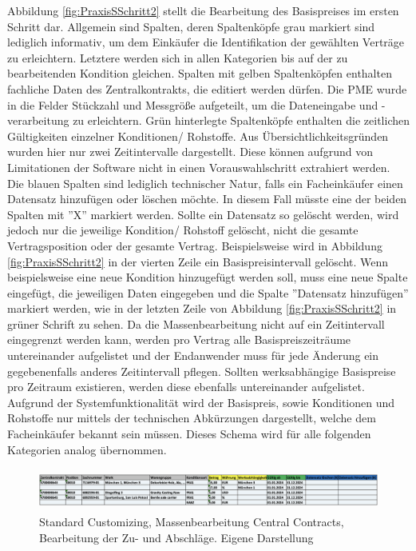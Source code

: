 Abbildung \ref{fig:PraxisSSchritt2} stellt die Bearbeitung des Basispreises im ersten Schritt dar. Allgemein sind Spalten, deren Spaltenköpfe grau markiert sind lediglich informativ, um dem Einkäufer die Identifikation der gewählten Verträge zu erleichtern. Letztere werden sich in allen Kategorien bis auf der zu bearbeitenden Kondition gleichen. Spalten mit gelben Spaltenköpfen enthalten fachliche Daten des Zentralkontrakts, die editiert werden dürfen. Die PME wurde in die Felder Stückzahl und Messgrö\ss e aufgeteilt, um die Dateneingabe und -verarbeitung zu erleichtern. Grün hinterlegte Spaltenköpfe enthalten die zeitlichen Gültigkeiten einzelner Konditionen/ Rohstoffe. Aus Übersichtlichkeitsgründen wurden hier nur zwei Zeitintervalle dargestellt. Diese können aufgrund von Limitationen der Software nicht in einen Vorauswahlschritt extrahiert werden. Die blauen Spalten sind lediglich technischer Natur, falls ein Facheinkäufer einen Datensatz hinzufügen oder löschen möchte. In diesem Fall müsste eine der beiden Spalten mit ''X'' markiert werden. Sollte ein Datensatz so gelöscht werden, wird jedoch nur \zB die jeweilige Kondition/ Rohstoff gelöscht, nicht die gesamte Vertragsposition oder der gesamte Vertrag. Beispielsweise wird in Abbildung \ref{fig:PraxisSSchritt2} in der vierten Zeile ein Basispreisintervall gelöscht. Wenn beispielsweise eine neue Kondition hinzugefügt werden soll, muss eine neue Spalte eingefügt, die jeweiligen Daten eingegeben und die Spalte ''Datensatz hinzufügen'' markiert werden, wie in der letzten Zeile von Abbildung \ref{fig:PraxisSSchritt2} in grüner Schrift zu sehen. Da die Massenbearbeitung nicht auf ein Zeitintervall eingegrenzt werden kann, werden pro Vertrag alle Basispreiszeiträume untereinander aufgelistet und der Endanwender muss für jede Änderung ein gegebenenfalls anderes Zeitintervall pflegen. Sollten werksabhängige Basispreise pro Zeitraum existieren, werden diese ebenfalls untereinander aufgelistet. Aufgrund der Systemfunktionalität wird der Basispreis, sowie Konditionen und Rohstoffe nur mittels der technischen Abkürzungen dargestellt, welche dem Facheinkäufer bekannt sein müssen. Dieses Schema wird für alle folgenden Kategorien analog übernommen.

\begin{figure}[H]
    \centering
    \includegraphics[height=1.38cm]{Bilder/Praxisteil-S-Schritt-3.png}
    \caption[Standard Customizing, Massenbearbeitung Central Contracts, Bearbeitung der Zu- und Abschläge]{Standard Customizing, Massenbearbeitung Central Contracts, Bearbeitung der Zu- und Abschläge. Eigene Darstellung}
    \label{fig:PraxisSSchritt3}
\end{figure}

